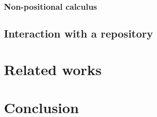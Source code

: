 \documentclass[preprint]{sigplanconf}
\begin{document}
\subsubsection{Non-positional calculus}

\subsection{Interaction with a repository}



\section{Related works} %




\section{Conclusion} %


\end{document}
